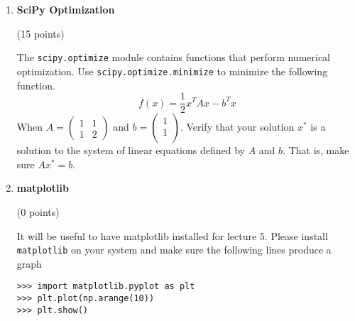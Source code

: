 \documentclass{article}
\newcounter{points}
\newcommand\setpoints[1]{\addtocounter{points}{#1}(#1 points)}
\newcommand\printpoints{Total number of points: \value{\thepoints}}
\begin{document}
\begin{enumerate}
\item \textbf{SciPy Optimization} \setpoints{15}

The \texttt{scipy.optimize} module contains functions that perform numerical optimization. Use \newline
\texttt{scipy.optimize.minimize} to minimize the following function. 
$$f(x) = \frac{1}{2}x^TAx - b^Tx$$
When 
$A= \begin{pmatrix}
1 & 1\\
1 & 2
\end{pmatrix}$
and $b = \begin{pmatrix}
1 \\
1 \\
\end{pmatrix}$.
Verify that your solution $x^*$ is a solution to the system of linear equations defined by $A$ and $b$. That is, make sure $Ax^*=b$.

\item \textbf{matplotlib} \setpoints{0}

It will be useful to have matplotlib installed for lecture 5. Please install \texttt{matplotlib} on your system and make sure the following lines produce a graph 
\begin{verbatim}
>>> import matplotlib.pyplot as plt
>>> plt.plot(np.arange(10))
>>> plt.show()
\end{verbatim}
\end{enumerate}
\end{document}
